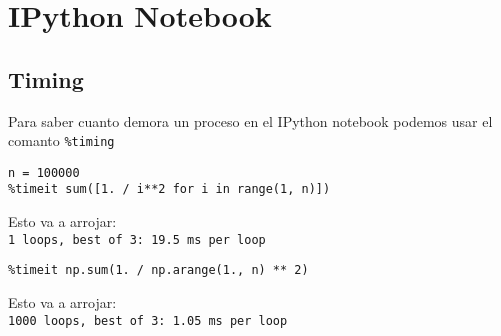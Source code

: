 \documentclass[12pt]{article}
\begin{document}

\section{IPython Notebook}

\subsection{Timing}

Para saber cuanto demora un proceso en el IPython notebook podemos usar el comanto \verb+%timing+

\begin{verbatim}
n = 100000
%timeit sum([1. / i**2 for i in range(1, n)])
\end{verbatim}

Esto va a arrojar:\\ 

\verb+1 loops, best of 3: 19.5 ms per loop+

\begin{verbatim}
%timeit np.sum(1. / np.arange(1., n) ** 2)
\end{verbatim}

Esto va a arrojar:\\

\verb+1000 loops, best of 3: 1.05 ms per loop+

{}

\end{document}

